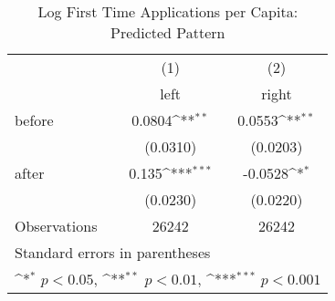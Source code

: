 \begin{table}[htbp]\centering
\def\sym#1{\ifmmode^{#1}\else\(^{#1}\)\fi}
\caption{Log First Time Applications per Capita: Predicted Pattern}
\begin{tabular}{l*{2}{c}}
\hline\hline
                    &\multicolumn{1}{c}{(1)}&\multicolumn{1}{c}{(2)}\\
                    &\multicolumn{1}{c}{left}&\multicolumn{1}{c}{right}\\
\hline
before              &      0.0804\sym{**} &      0.0553\sym{**} \\
                    &    (0.0310)         &    (0.0203)         \\
[1em]
after               &       0.135\sym{***}&     -0.0528\sym{*}  \\
                    &    (0.0230)         &    (0.0220)         \\
\hline
Observations        &       26242         &       26242         \\
\hline\hline
\multicolumn{3}{l}{\footnotesize Standard errors in parentheses}\\
\multicolumn{3}{l}{\footnotesize \sym{*} \(p<0.05\), \sym{**} \(p<0.01\), \sym{***} \(p<0.001\)}\\
\end{tabular}
\end{table}
